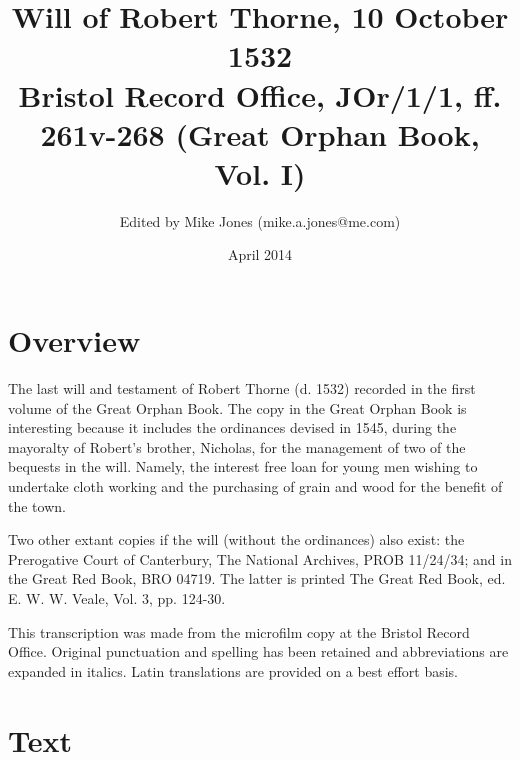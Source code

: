 \documentclass[a4paper,12pt]{article}
\makeatletter
\def\authorname{Mike Jones}
\def\authoremail{mike.a.jones@me.com}
\def\shorttitle{Will of Robert Thorne, 10 October 1532}
\def\abstract{The last will and testament of Robert Thorne (d. 1532) recorded in the first volume of the Great Orphan Book. The copy in the Great Orphan Book is interesting because it includes the ordinances devised in 1545, during the mayoralty of Robert's brother, Nicholas, for the management of two of the bequests in the will. Namely, the interest free loan for young men wishing to undertake cloth working and the purchasing of grain and wood for the benefit of the town.}
\def\pubdate{April 2014}
\def\archivename{Bristol Record Office}
\def\archiverefno{JOr/1/1, ff. 261v-268}
\def\archivedoctitle{Great Orphan Book, Vol. I}
\makeatother
\begin{document}
\title{\Large \shorttitle\\\normalsize \archivename \hspace{0 mm}, \archiverefno \hspace{1 mm} (\archivedoctitle)}\vspace{-5em}
\author{\small Edited by \authorname \hspace{0 mm} (\authoremail)}
\date{\small \pubdate}
\maketitle

\section*{Overview}
\abstract

Two other extant copies if the will (without the ordinances) also exist: the Prerogative Court of Canterbury, The National Archives, PROB 11/24/34; and in the Great Red Book, BRO 04719. The latter is printed The Great Red Book, ed. E. W. W. Veale, Vol. 3, pp. 124-30.

This transcription was made from the microfilm copy at the Bristol Record Office. Original punctuation and spelling has been retained and abbreviations are expanded in italics. Latin translations are provided on a best effort basis.
\section*{Text}
\end{document}

